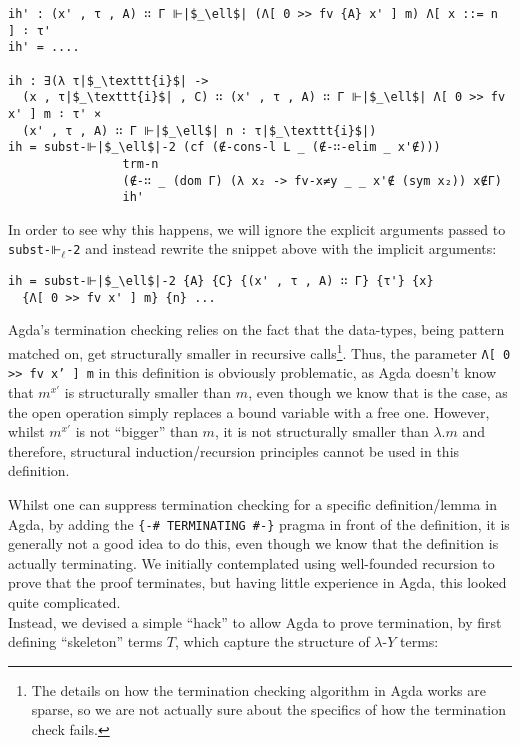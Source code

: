 \documentclass[a4paper, 12pt, twoside]{style/ociamthesis}
\theoremstyle{plain}
\theoremstyle{definition}
\theoremstyle{remark}
\newcommand{\lamy}{\lambda\text{-}Y}
\begin{document}
\begin{verbatim}
ih' : (x' , τ , A) ∷ Γ ⊩|$_\ell$| (Λ[ 0 >> fv {A} x' ] m) Λ[ x ::= n ] ∶ τ'
ih' = ....

ih : ∃(λ τ|$_\texttt{i}$| ->
  (x , τ|$_\texttt{i}$| , C) ∷ (x' , τ , A) ∷ Γ ⊩|$_\ell$| Λ[ 0 >> fv x' ] m ∶ τ' × 
  (x' , τ , A) ∷ Γ ⊩|$_\ell$| n ∶ τ|$_\texttt{i}$|)
ih = subst-⊩|$_\ell$|-2 (cf (∉-cons-l L _ (∉-∷-elim _ x'∉)))
                trm-n
                (∉-∷ _ (dom Γ) (λ x₂ -> fv-x≠y _ _ x'∉ (sym x₂)) x∉Γ)
                ih'
\end{verbatim}

In order to see why this happens, we will ignore the explicit arguments
passed to \texttt{subst-⊩$_\ell$-2} and instead rewrite the snippet
above with the implicit arguments:

\begin{verbatim}
ih = subst-⊩|$_\ell$|-2 {A} {C} {(x' , τ , A) ∷ Γ} {τ'} {x} 
  {Λ[ 0 >> fv x' ] m} {n} ...
\end{verbatim}

Agda's termination checking relies on the fact that the data-types,
being pattern matched on, get structurally smaller in recursive
calls\footnote{The details on how the termination checking algorithm in
  Agda works are sparse, so we are not actually sure about the specifics
  of how the termination check fails.}. Thus, the parameter
\texttt{Λ[ 0 >> fv x' ] m} in this definition is obviously problematic,
as Agda doesn't know that \(m^{x'}\) is structurally smaller than \(m\),
even though we know that is the case, as the open operation simply
replaces a bound variable with a free one. However, whilst \(m^{x'}\) is
not ``bigger'' than \(m\), it is not structurally smaller than
\(\lambda.m\) and therefore, structural induction/recursion principles
cannot be used in this definition.

Whilst one can suppress termination checking for a specific
definition/lemma in Agda, by adding the \texttt{\{-\# TERMINATING \#-\}}
pragma in front of the definition, it is generally not a good idea to do
this, even though we know that the definition is actually terminating.
We initially contemplated using well-founded recursion to prove that the
proof terminates, but having little experience in Agda, this looked
quite complicated.\\
Instead, we devised a simple ``hack'' to allow Agda to prove
termination, by first defining ``skeleton'' terms \(T\), which capture
the structure of \(\lamy\) terms:
\end{document}
